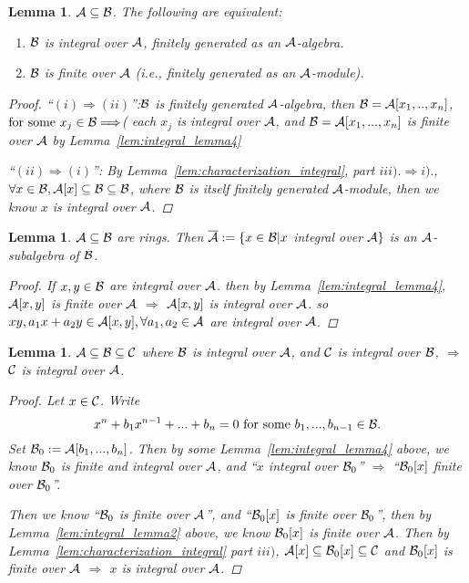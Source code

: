 \documentclass[11pt]{article}
\newtheorem{lemma}[thm]{Lemma}
\newcommand{\cala}{{\cal A}}
\newcommand{\calb}{{\cal B}}
\newcommand{\calc}{{\cal C}}
\newcommand{\Lrta}{\Longrightarrow}
\begin{document}
\begin{lemma}\label{lem:integral_lemma5}
$\cala\subseteq \calb$. The following are equivalent:
\begin{enumerate}[label=(\roman*)]
\item $\calb$ is integral over $\cala$, finitely generated as an $\cala$-algebra.
\item $\calb$ is finite over $\cala$ (i.e., finitely generated as an $\cala$-module).
\end{enumerate}
\begin{proof}
``$(i)\Lrta(ii)$'':$\calb$ is finitely generated $\cala$-algebra, then $\calb=\cala[x_1,..,x_n]$, $ \text{for some $x_j\in \calb$}\Lrta$( each $x_j$ is integral over $\cala$, and $\calb=\cala[x_1,...,x_n]$ is finite over $\cala$ by Lemma~\ref{lem:integral_lemma4}

``$(ii)\Lrta(i)$'': By Lemma~\ref{lem:characterization_integral}, part $iii).\Lrta i).$, $\forall x\in\calb, \cala[x]\subseteq \calb\subseteq\calb$, where $\calb$ is itself finitely generated $\cala$-module, then we know $x$ is integral over $\cala$.
\end{proof}
\end{lemma}

\begin{lemma}\label{lem:integral_lemma6}
$\cala\subseteq \calb$ are rings. Then $\overline{\cala}:=\{x\in \calb|x$ integral over $\cala\}$ is an $\cala$-subalgebra of $\calb$.
\begin{proof}
If $x,y\in \calb$ are integral over $\cala$. then by Lemma~\ref{lem:integral_lemma4}, $\cala[x,y]$ is finite over $\cala$ $\Lrta$ $\cala[x,y]$ is integral over $\cala$.
so $xy,a_1x+a_2y\in\cala[x,y],\forall a_1,a_2\in\cala$ are integral over $\cala$.
\end{proof}
\end{lemma}

\begin{lemma}\label{lem:integral_lemma7}
$\cala\subseteq \calb\subseteq\calc$ where $\calb$ is integral over $\cala$, and $\calc$ is integral over $\calb$, $\Lrta$ $\calc$ is integral over $\cala$.
\begin{proof}
Let $x\in\calc$. Write
$$
x^n+b_1x^{n-1}+...+b_n=0 \text{  for some $b_1,...,b_{n-1}\in\calb$}.
$$
Set $\calb_0:=\cala[b_1,...,b_n]$. Then by some Lemma~\ref{lem:integral_lemma4} above, we know $\calb_0$ is finite and integral over $\cala$, and ``$x$ integral over $\calb_0$'' $\Lrta$ ``$\calb_0[x]$ finite over $\calb_0$''.

Then we know  ``$\calb_0$ is finite over $\cala$'', and ``$\calb_0[x]$ is finite over $\calb_0$'', then by Lemma~\ref{lem:integral_lemma2} above, we know $\calb_0[x]$ is finite over $\cala$. Then by Lemma~\ref{lem:characterization_integral} part $iii)$, $\cala[x]\subseteq \calb_0[x]\subseteq\calc$ and $\calb_0[x]$ is finite over $\cala$ $\Lrta$ $x$ is integral over $\cala$.
\end{proof} 
\end{lemma}
\end{document}
